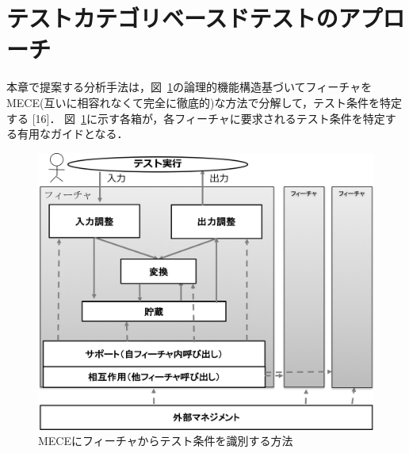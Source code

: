 \documentclass[a4paper,12pt]{jreport}
\begin{document}
\section{テストカテゴリベースドテストのアプローチ}
本章で提案する分析手法は，図~\ref{fig:D-3-Fig3}の論理的機能構造基づいてフィーチャをMECE(互いに相容れなくて完全に徹底的)な方法で分解して，テスト条件を特定する [16]． 図~\ref{fig:D-3-Fig3}に示す各箱が，各フィーチャに要求されるテスト条件を特定する有用なガイドとなる．
\begin{figure}[h]
  \begin{center}
  \includegraphics[width=12cm]{./image/D-3-Fig3.png}
  \caption{MECEにフィーチャからテスト条件を識別する方法}
  \label{fig:D-3-Fig3}
  \end{center}
   \end{figure}
\end{document}
